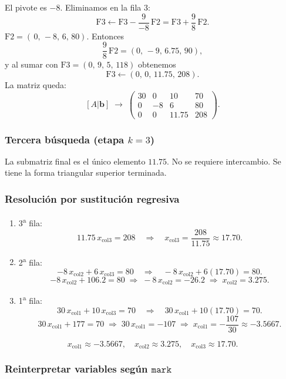 El pivote es \(-8\). Eliminamos en la fila 3:
\[
\text{F3} \leftarrow \text{F3} - \frac{9}{-8}\,\text{F2}
= \text{F3} + \frac{9}{8}\,\text{F2}.
\]
\(\text{F2}=(\,0,\,-8,\,6,\,80)\). Entonces
\[
\frac{9}{8}\,\text{F2}=(0,\,-9,\,6.75,\,90),
\]
y al sumar con \(\text{F3}=(0,\,9,\,5,\,118)\) obtenemos
\[
\text{F3}\leftarrow(0,\,0,\,11.75,\,208).
\]
La matriz queda:
\[
[A|\mathbf{b}]\;\to\;
\begin{pmatrix}
30 & 0 & 10 & 70\\
0 & -8 & 6 & 80\\
0 & 0 & 11.75 & 208
\end{pmatrix}.
\]

\subsubsection{Tercera búsqueda (etapa \(k=3\))}

La submatriz final es el único elemento \(11.75\). No se requiere intercambio.
Se tiene la forma triangular superior terminada.

\subsubsection{Resolución por sustitución regresiva}

\begin{enumerate}
\item 3\textsuperscript{a} fila:
\[
11.75\,x_{\text{col3}}=208 \quad\Longrightarrow\quad
x_{\text{col3}}=\frac{208}{11.75}\approx 17.70.
\]
\item 2\textsuperscript{a} fila:
\[
-8\,x_{\text{col2}} + 6\,x_{\text{col3}}=80 \quad\Longrightarrow\quad
-8\,x_{\text{col2}} + 6(17.70)=80.
\]
\[
-8\,x_{\text{col2}} +106.2=80
\;\Longrightarrow\;
-8\,x_{\text{col2}}=-26.2
\;\Longrightarrow\;
x_{\text{col2}}=3.275.
\]
\item 1\textsuperscript{a} fila:
\[
30\,x_{\text{col1}} +10\,x_{\text{col3}}=70
\quad\Longrightarrow\quad
30\,x_{\text{col1}} +10(17.70)=70.
\]
\[
30\,x_{\text{col1}} +177=70
\;\Longrightarrow\;
30\,x_{\text{col1}}=-107
\;\Longrightarrow\;
x_{\text{col1}}=-\frac{107}{30}\approx -3.5667.
\]
\end{enumerate}

\[
x_{\text{col1}}\approx-3.5667,\quad
x_{\text{col2}}\approx3.275,\quad
x_{\text{col3}}\approx17.70.
\]

\subsubsection{Reinterpretar variables según \(\texttt{mark}\)}

